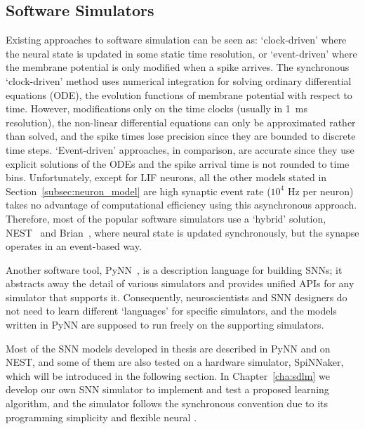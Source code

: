 \subsection{Software Simulators}
Existing approaches to software simulation can be seen as: `clock-driven' where the neural state is updated in some static time resolution, or `event-driven' where the membrane potential is only modified when a spike arrives.
The synchronous `clock-driven' method uses numerical integration for solving ordinary differential equations (ODE), the evolution functions of membrane potential with respect to time.
However, modifications only on the time clocks (usually in 1~ms resolution), the non-linear differential equations can only be approximated rather than solved, and the spike times lose precision since they are bounded to discrete time steps.
`Event-driven' approaches, in comparison, are accurate since they use explicit solutions of the ODEs and the spike arrival time is not rounded to time bins.
Unfortunately, except for LIF neurons, all the other models stated in Section~\ref{subsec:neuron_model} are \DIFdelbegin {}\DIFdelend \DIFaddbegin {}\DIFaddend high synaptic event rate ($10^4$ Hz per neuron) takes no advantage of computational efficiency using this asynchronous approach.
Therefore, most of the popular software simulators use a `hybrid' solution, \DIFdelbegin {}\DIFdelend \DIFaddbegin {}\DIFaddend NEST~\citep{gewaltig2007nest} and Brian~\citep{goodman2008brian}, where 
neural state is updated synchronously, but the synapse operates in an event-based way.

Another software tool, PyNN~\citep{davison2008pynn}, is a description language for building SNNs;
it abstracts away the detail of various simulators and provides unified APIs for any simulator that supports it.
Consequently, neuroscientists and SNN designers do not need to learn different `languages' for specific simulators, and the models written in PyNN are supposed to run freely on the supporting simulators.

Most of the SNN models developed in \DIFdelbegin {}\DIFdelend \DIFaddbegin {}\DIFaddend thesis are described in PyNN and \DIFdelbegin {}\DIFdelend \DIFaddbegin {}\DIFaddend on NEST, and some of them are also tested on a hardware simulator, SpiNNaker\DIFaddbegin {}\DIFaddend , which will be introduced in the following section.
In Chapter~\ref{cha:sdlm} we develop our own SNN simulator to implement and test a proposed learning algorithm, and the simulator follows the synchronous convention due to its programming simplicity and flexible neural \DIFdelbegin {}\DIFdelend \DIFaddbegin {}\DIFaddend . 

